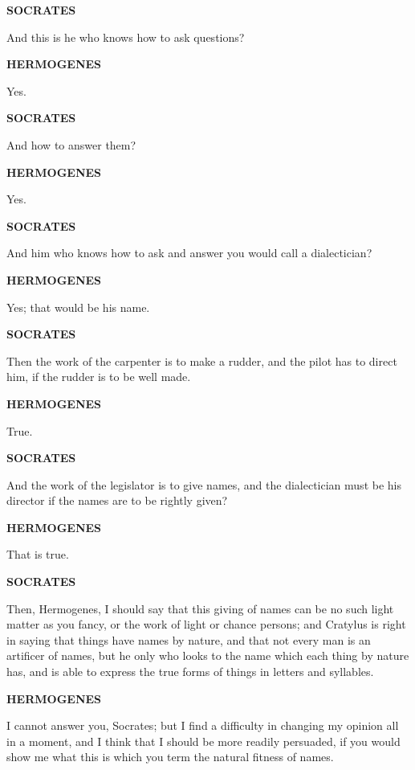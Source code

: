 \documentclass[11pt,letter]{article}
\begin{document}
\par \textbf{SOCRATES}
\par   And this is he who knows how to ask questions?

\par \textbf{HERMOGENES}
\par   Yes.

\par \textbf{SOCRATES}
\par   And how to answer them?

\par \textbf{HERMOGENES}
\par   Yes.

\par \textbf{SOCRATES}
\par   And him who knows how to ask and answer you would call a dialectician?

\par \textbf{HERMOGENES}
\par   Yes; that would be his name.

\par \textbf{SOCRATES}
\par   Then the work of the carpenter is to make a rudder, and the pilot has to direct him, if the rudder is to be well made.

\par \textbf{HERMOGENES}
\par   True.

\par \textbf{SOCRATES}
\par   And the work of the legislator is to give names, and the dialectician must be his director if the names are to be rightly given?

\par \textbf{HERMOGENES}
\par   That is true.

\par \textbf{SOCRATES}
\par   Then, Hermogenes, I should say that this giving of names can be no such light matter as you fancy, or the work of light or chance persons; and Cratylus is right in saying that things have names by nature, and that not every man is an artificer of names, but he only who looks to the name which each thing by nature has, and is able to express the true forms of things in letters and syllables.

\par \textbf{HERMOGENES}
\par   I cannot answer you, Socrates; but I find a difficulty in changing my opinion all in a moment, and I think that I should be more readily persuaded, if you would show me what this is which you term the natural fitness of names.
\end{document}
